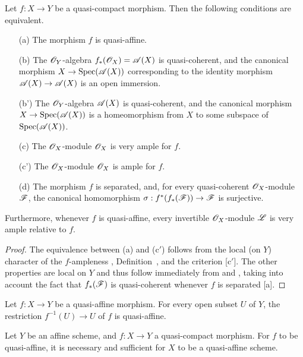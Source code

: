 \begin{proposition}[5.1.6]
\label{II.5.1.6}
Let $f:X\to Y$ be a quasi-compact morphism.
Then the following conditions are equivalent.
\begin{enumerate}
  \item[{\rm(a)}] The morphism $f$ is quasi-affine.
  \item[{\rm(b)}] The $\mathscr{O}_Y$-algebra $f_*(\mathscr{O}_X)=\mathscr{A}(X)$ is quasi-coherent, and the canonical morphism $X\to\Spec(\sh{A}(X))$ corresponding to the identity morphism $\sh{A}(X)\to\sh{A}(X)$  is an open immersion.
  \item[{\rm(b')}] The $\mathscr{O}_Y$-algebra $\mathscr{A}(X)$ is quasi-coherent, and the canonical morphism $X\to\Spec(\sh{A}(X))$ is a homeomorphism from $X$ to some subspace of $\operatorname{Spec}(\mathscr{A}(X))$.
  \item[{\rm(c)}] The $\mathscr{O}_X$-module $\mathscr{O}_X$ is very ample for $f$.
  \item[{\rm(c')}] The $\mathscr{O}_X$-module $\mathscr{O}_X$ is ample for $f$.
  \item[{\rm(d)}] The morphism $f$ is separated, and, for every quasi-coherent $\mathscr{O}_X$-module $\mathscr{F}$, the canonical homomorphism $\sigma:f^*(f_*(\sh{F}))\to\sh{F}$  is surjective.
\end{enumerate}

Furthermore, whenever $f$ is quasi-affine, every invertible $\mathscr{O}_X$-module $\mathscr{L}$ is very ample relative to $f$.
\end{proposition}

\begin{proof}
\label{proof-II.5.1.6}
The equivalence between (a) and (c$'$) follows from the local (on $Y$) character of the $f$-ampleness , Definition~, and the criterion [c$'$].
The other properties are local on $Y$
and thus follow immediately from  and , taking into account the fact that $f_*(\mathscr{F})$ is quasi-coherent whenever $f$ is separated [a].
\end{proof}

\begin{corollary}[5.1.7]
\label{II.5.1.7}
Let $f:X\to Y$ be a quasi-affine morphism.
For every open subset $U$ of $Y$, the restriction $f^{-1}(U)\to U$ of $f$ is quasi-affine.
\end{corollary}

\begin{corollary}[5.1.8]
\label{II.5.1.8}
Let $Y$ be an affine scheme, and $f:X\to Y$ a quasi-compact morphism.
For $f$ to be quasi-affine, it is necessary and sufficient for $X$ to be a quasi-affine scheme.
\end{corollary}

